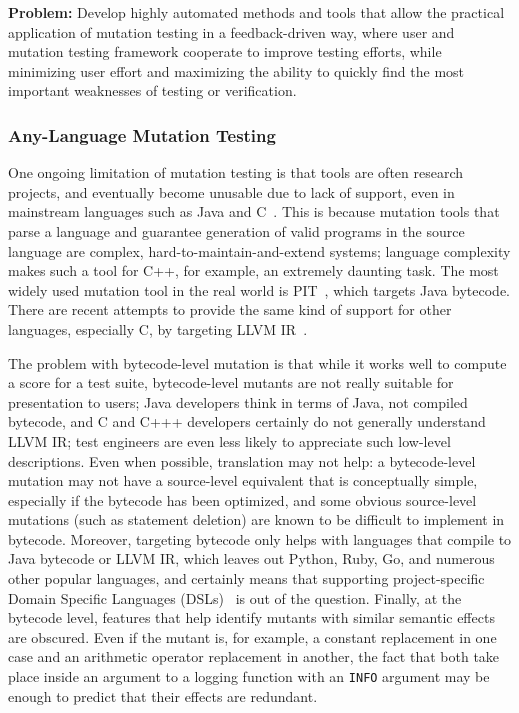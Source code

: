 \begin{framed}
{\bf Problem:}  Develop highly automated methods and tools that allow the practical application of mutation testing in a feedback-driven way, where user and mutation testing framework cooperate to improve testing efforts, while minimizing user effort and maximizing the ability to quickly find the most important weaknesses of testing or verification.
\end{framed}

\subsubsection{Any-Language Mutation Testing}

One ongoing limitation of mutation testing is that tools are often research projects, and eventually become unusable due to lack of support, even in mainstream languages such as Java and C~\cite{MutChoice}.  This is because mutation tools that parse a language and guarantee generation of valid programs in the source language are complex, hard-to-maintain-and-extend systems; language complexity makes such a tool for C++, for example, an extremely daunting task.  The most widely used mutation tool in the real world is PIT~\cite{pittest}, which targets Java bytecode.  There are recent attempts to provide the same kind of support for other languages, especially C, by targeting LLVM IR~\cite{HaririLLVM}.

The problem with bytecode-level mutation is that while it works well to compute a score for a test suite, bytecode-level mutants are not really suitable for presentation to users; Java developers think in terms of Java, not compiled bytecode, and C and C+++ developers certainly do not generally understand LLVM IR; test engineers are even less likely to appreciate such low-level descriptions.  Even when possible, translation may not help: a bytecode-level mutation may not have a source-level equivalent that is conceptually simple, especially if the bytecode has been optimized, and some obvious source-level mutations (such as statement deletion) are known to be difficult to implement in bytecode.  Moreover, targeting bytecode only helps with languages that compile to Java bytecode or LLVM IR, which leaves out Python, Ruby, Go, and numerous other popular languages, and certainly means that supporting project-specific Domain Specific Languages (DSLs)~\cite{Fow10} is out of the question.  Finally, at the bytecode level, features that help identify mutants with similar semantic effects are obscured.  Even if the mutant is, for example, a constant replacement in one case and an arithmetic operator replacement in another, the fact that both take place inside an argument to a logging function with an {\tt INFO} argument may be enough to predict that their effects are redundant.

